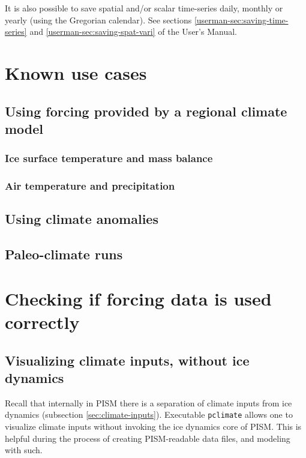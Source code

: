 \documentclass[titlepage,letterpaper,final]{scrartcl}
\def\optsection#1{%
  \def\optindex##1{\index[options]{#1!##1}}
  \def\optseealso##1{\index[options]{#1|see{##1}}}
}
\begin{document}
It is also possible to save spatial and/or scalar time-series daily, monthly or
yearly (using the Gregorian calendar). See sections \ref*{userman-sec:saving-time-series}
and \ref*{userman-sec:saving-spat-vari} of the User's Manual.

\section{Known use cases}
\label{sec:known-use-cases}

\subsection{Using forcing provided by a regional climate model}
\label{sec:regional-model}

\subsubsection{Ice surface temperature and mass balance}
\label{sec:ice-surface-bc}

\subsubsection{Air temperature and precipitation}
\label{sec:air-temp-and-precip}


\subsection{Using climate anomalies}
\label{sec:climate-anomalies}


\subsection{Paleo-climate runs}
\label{sec:paleo-climate}

\section{Checking if forcing data is used correctly}
\label{sec:checking-forcing}


\subsection{Visualizing climate inputs, without ice dynamics}
\label{sec:pclimate}
\optsection{\texttt{pclimate} options}

Recall that internally in PISM there is a separation of climate inputs from ice
dynamics (subsection \ref{sec:climate-inputs}). Executable
\texttt{pclimate}  allows one to visualize climate inputs without
invoking the ice dynamics core of PISM. This is helpful during the process of
creating PISM-readable data files, and modeling with such.
\end{document}
